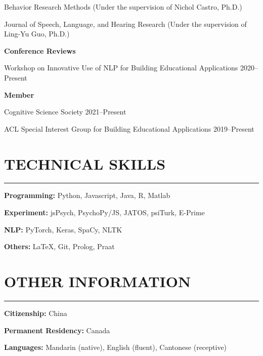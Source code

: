 \documentclass[11pt]{article}
\newcommand{\cvsection}[1]{\vspace{-0.2cm}\section*{\Large #1}\vspace{-0.2cm}\hrule\vspace{0.2cm}}
\newcommand{\h}[1]{\hspace{15pt} #1}
\begin{document}
\h{Behavior Research Methods (Under the supervision of Nichol Castro, Ph.D.)}

\h{Journal of Speech, Language, and Hearing Research (Under the supervision of Ling-Yu Guo, Ph.D.)}

\textbf{Conference Reviews}

\h{Workshop on Innovative Use of NLP for Building Educational Applications \hfill 2020--Present}

\textbf{Member}

\h{Cognitive Science Society \hfill 2021--Present}

\h{ACL Special Interest Group for Building Educational Applications \hfill 2019--Present}



\cvsection{TECHNICAL SKILLS}

\textbf{Programming:} Python, Javascript, Java, R, Matlab

\textbf{Experiment:} jsPsych, PsychoPy/JS, JATOS, psiTurk, E-Prime

\textbf{NLP:} PyTorch, Keras, SpaCy, NLTK

\textbf{Others:} \LaTeX, Git, Prolog, Praat


\cvsection{OTHER INFORMATION}

\textbf{Citizenship:} China

\textbf{Permanent Residency:} Canada

\textbf{Languages:} Mandarin (native), English (fluent), Cantonese (receptive)
\end{document}
